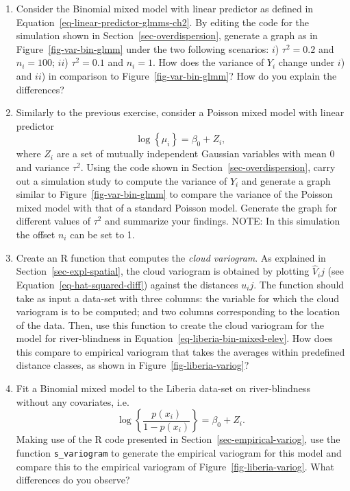\documentclass[
  letterpaper,
]{krantz}
\begin{document}
\begin{enumerate}
\def\labelenumi{\arabic{enumi}.}
\setcounter{enumi}{1}
\item
  Consider the Binomial mixed model with linear predictor as defined in
  Equation~\ref{eq-linear-predictor-glmms-ch2}. By editing the code for
  the simulation shown in Section~\ref{sec-overdispersion}, generate a
  graph as in Figure~\ref{fig-var-bin-glmm} under the two following
  scenarios: \(i\)) \(\tau^2 = 0.2\) and \(n_i=100\); \(ii\))
  \(\tau^2 = 0.1\) and \(n_i = 1\). How does the variance of \(Y_i\)
  change under \(i\)) and \(ii\)) in comparison to
  Figure~\ref{fig-var-bin-glmm}? How do you explain the differences?
\item
  Similarly to the previous exercise, consider a Poisson mixed model
  with linear predictor \[
  \log\left\{\mu_i\right\} = \beta_0 + Z_i,
  \] where \(Z_i\) are a set of mutually independent Gaussian variables
  with mean 0 and variance \(\tau^2\). Using the code shown in
  Section~\ref{sec-overdispersion}, carry out a simulation study to
  compute the variance of \(Y_i\) and generate a graph similar to
  Figure~\ref{fig-var-bin-glmm} to compare the variance of the Poisson
  mixed model with that of a standard Poisson model. Generate the graph
  for different values of \(\tau^2\) and summarize your findings. NOTE:
  In this simulation the offset \(n_i\) can be set to 1.
\item
  Create an R function that computes the \emph{cloud variogram}. As
  explained in Section~\ref{sec-expl-spatial}, the cloud variogram is
  obtained by plotting \(\hat{V}_ij\) (see
  Equation~\ref{eq-hat-squared-diff}) against the distances \(u_ij\).
  The function should take as input a data-set with three columns: the
  variable for which the cloud variogram is to be computed; and two
  columns corresponding to the location of the data. Then, use this
  function to create the cloud variogram for the model for
  river-blindness in Equation~\ref{eq-liberia-bin-mixed-elev}. How does
  this compare to empirical variogram that takes the averages within
  predefined distance classes, as shown in
  Figure~\ref{fig-liberia-variog}?
\item
  Fit a Binomial mixed model to the Liberia data-set on river-blindness
  without any covariates, i.e.~\[
  \log\left\{\frac{p(x_i)}{1-p(x_i)}\right\} = \beta_0 + Z_i.
  \] Making use of the R code presented in
  Section~\ref{sec-empirical-variog}, use the function
  \texttt{s\_variogram} to generate the empirical variogram for this
  model and compare this to the empirical variogram of
  Figure~\ref{fig-liberia-variog}. What differences do you observe?
\end{enumerate}
\end{document}

